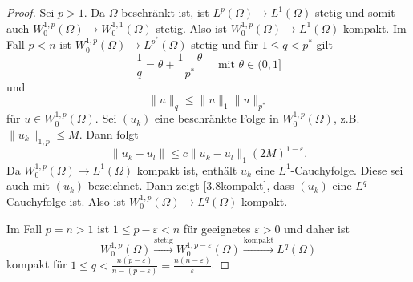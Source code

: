 \documentclass[
paper=a4,
bibtotocnumbered,
liststotocnumbered,
tablecaptionabove,
pointlessnumbers,
twoside,
openright,
10pt
]
{report}
\theoremstyle{definition}
\numberwithin{equation}{chapter}
\begin{document}
\begin{proof}
Sei $p>1$.  Da $\Omega$ beschränkt ist, ist $L^p(\Omega)\to L^1(\Omega)$ stetig und somit auch 
$W_0^{1,p}(\Omega) \to W_0^{1,1}(\Omega)$ stetig. Also ist $W_0^{1,p}(\Omega) \to L^{1}(\Omega)$ kompakt. Im Fall $p<n$ ist $W_0^{1,p}(\Omega) \to L^{p^*}(\Omega)$ stetig und für $1\le q<p^*$ gilt
\begin{equation}
 \frac{1}{q} = \theta + \frac{1-\theta}{p^*} \quad \text{ mit } \theta\in (0,1]
\end{equation}
und 
\begin{equation}
 \| u\|_q \le \|u\|_1 \| u\|_{p^*}
\end{equation}
für $u\in W_0^{1,p}(\Omega)$.  Sei $(u_k)$ eine beschränkte Folge in $W_0^{1,p}(\Omega)$, z.B. $\|u_k\|_{1,p}\le M$. Dann folgt
\begin{equation}\label{3.8kompakt}
 \|u_k - u_l\| \le c \|u_k - u_l\|_1 (2M)^{1-\varepsilon}.
\end{equation}
Da $W_0^{1,p}(\Omega) \to L^1(\Omega)$ kompakt ist, enthält $u_k$ eine $L^1$-Cauchyfolge. Diese sei auch mit $(u_k)$ bezeichnet. Dann zeigt \eqref{3.8kompakt}, dass $(u_k)$ eine $L^q$-Cauchyfolge ist. Also ist $W_0^{1,p}(\Omega) \to L^q(\Omega)$ kompakt.

Im Fall $p=n>1$ ist $1\le p - \varepsilon <n$ für geeignetes $\varepsilon>0$ und daher ist 
\begin{equation}
 W_0^{1,p}(\Omega) \stackrel{\text{stetig}}{\to} W_0^{1,p-\varepsilon}(\Omega) \stackrel{\text{kompakt}}{\to} L^q(\Omega)
\end{equation}
kompakt für $1\le q < \frac{n(p-\varepsilon)}{n-(p-\varepsilon)} = \frac{n(n-\varepsilon)}{\varepsilon}$.
\end{proof}
\end{document}

